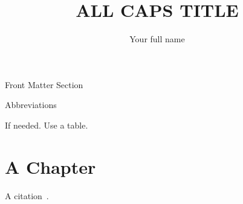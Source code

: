 \documentclass[12pt,\mydriver]{thesis}  %
\title{ALL CAPS TITLE}
\author{Your full name}
\begin{document}
\pagestyle{empty} %

\pagestyle{plain}  \setcounter{page}{2}

\renewcommand{\baselinestretch}{2}
\normalsize %


\begin{center}
\large{Front Matter Section}
\end{center} 
\lipsum[5-6]
\newpage

    \renewcommand{\contentsname}{Table of Contents}
\renewcommand{\baselinestretch}{1}
\normalsize
\tableofcontents %
\newpage



\begin{center}
\large{Abbreviations}
\end{center} 

If needed. Use a table.
\newpage

\setlength{\parskip}{0em}
\setcounter{page}{1}
\renewcommand{\baselinestretch}{2}
\normalsize

\chapter{A Chapter}
A citation~\cite{fan2022}.
\end{document}
